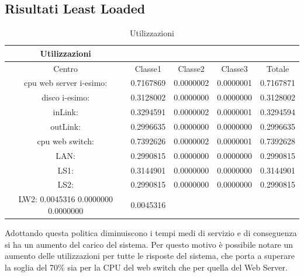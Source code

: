 \subsection{Risultati Least Loaded}
\begin{table}[htbp]
\begin{center}
\begin{tabular}{|c|c|c|c|c|}
\hline
Utilizzazioni\\
\hline
Centro &Classe1 &Classe2 &Classe3 &Totale\\
\hline
\hline
 cpu web server i-esimo: 	&0.7167869	&0.0000002	&0.0000001	&0.7167871\\
\hline
 disco i-esimo: 	&0.3128002	&0.0000000	&0.0000000	&0.3128002\\
\hline
 inLink: 	&0.3294591	&0.0000002	&0.0000001	&0.3294594\\
\hline
 outLink: 	&0.2996635	&0.0000000	&0.0000000	&0.2996635\\
\hline
 cpu web switch: 	&0.7392626	&0.0000002	&0.0000001	&0.7392628\\
\hline
 LAN: 	&0.2990815	&0.0000000	&0.0000000	&0.2990815\\
\hline
 LS1: 	&0.3144901	&0.0000000	&0.0000000	&0.3144901\\
\hline
 LS2:	&0.2990815	&0.0000000	&0.0000000	&0.2990815\\
\hline
 LW2: 	0.0045316	0.0000000	0.0000000	&0.0045316\\
\hline
\end{tabular}
\end{center}
\caption{Utilizzazioni}
\label{utilizzazioni}
\end{table}
Adottando questa politica diminuiscono i tempi medi di servizio e di conseguenza si ha un aumento del carico del sistema. Per questo motivo è possibile notare un aumento delle utilizzazioni per tutte le risposte del sistema, che porta a superare la soglia del 70\% sia per la CPU del web switch che per quella del Web Server.
